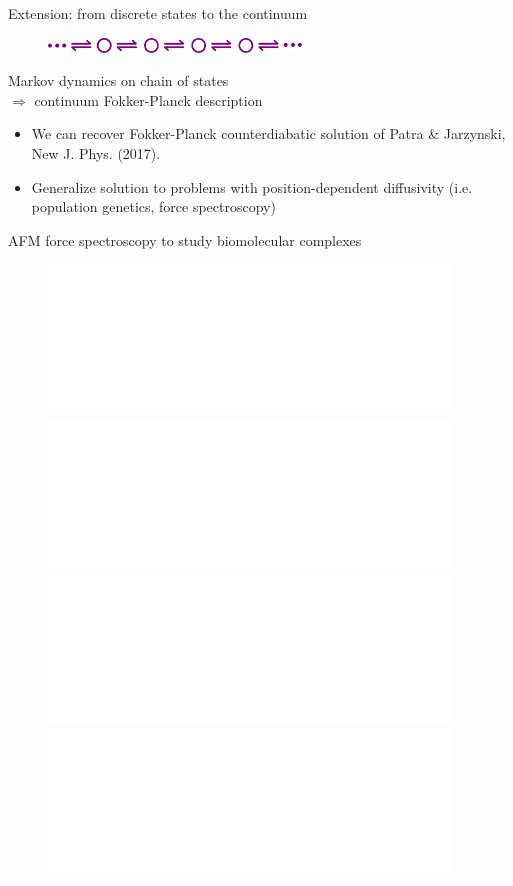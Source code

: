 \documentclass{beamer}
\begin{document}
\begin{frame}{Extension:  from discrete states to the continuum}

  \begin{figure}
    \centering
    \includegraphics[width=0.6\textwidth]{oned.pdf}
  \end{figure}

  \begin{center}
  Markov dynamics on chain of states\\
  $\Rightarrow$ continuum  Fokker-Planck description
\end{center}

  \pause
  \begin{itemize}

  \item We can recover Fokker-Planck counterdiabatic solution of {\color{green!50!black} Patra \& Jarzynski, New J. Phys. (2017)}.\\[1em]

    \pause
    
    \item Generalize solution to problems with position-dependent
      diffusivity (i.e. population genetics, force spectroscopy)

   \end{itemize}
\end{frame}

\begin{frame}{AFM force spectroscopy to study biomolecular complexes}

  \vspace{1em}
  \begin{figure}
    \centering
    \includegraphics<1>[width=0.95\textwidth]{afm_setup1.pdf}\includegraphics<2>[width=0.95\textwidth]{afm_setup2.pdf}\includegraphics<3>[width=0.95\textwidth]{afm_setup3.pdf}\includegraphics<4>[width=0.95\textwidth]{afm_setup4.pdf}
  \end{figure}

\end{frame}
\end{document}
